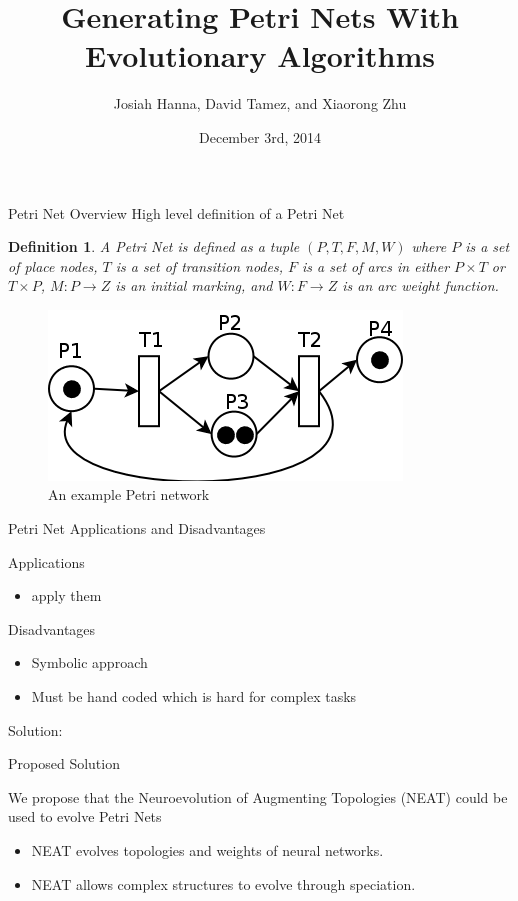 \documentclass[12pt]{beamer}
\author{Josiah Hanna, David Tamez, and Xiaorong Zhu}
\title{Generating Petri Nets With Evolutionary Algorithms}
\institute{The University of Texas at Austin}
\date{December 3rd, 2014}
\newtheorem{myDef}{Definition}
\begin{document}
\begin{frame}
\titlepage
\end{frame}

\begin{frame}{Petri Net Overview}
High level definition of a Petri Net
\begin{myDef}
A Petri Net is defined as a tuple $(P,T,F,M,W)$ where $P$ is a set of place nodes, $T$ is a set of transition nodes, $F$ is a set of arcs in either $P \times T$ or $T \times P$, $M: P \rightarrow Z$ is an initial marking, and $W: F \rightarrow Z$ is an arc weight function.
\end{myDef}
\begin{figure}
\includegraphics[scale=0.25]{petri_net}
\caption[]{An example Petri network \label{exampleNet}}
\end{figure}
\end{frame}

\begin{frame}{Petri Net Applications and Disadvantages}

Applications
\begin{itemize}
\item apply them
\end{itemize}
Disadvantages
\begin{itemize}
\item Symbolic approach
\item Must be hand coded which is hard for complex tasks
\end{itemize}

Solution: 


\end{frame}

\begin{frame}{Proposed Solution}

We propose that the Neuroevolution of Augmenting Topologies (NEAT) could be used to evolve Petri Nets

\begin{itemize}
\item NEAT evolves topologies and weights of neural networks.
\item NEAT allows complex structures to evolve through speciation.
\end{itemize}

\end{frame}
\end{document}
